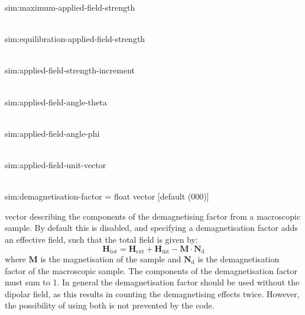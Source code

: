 {\zicf  sim:maximum-applied-field-strength}\\

{\zicf sim:equilibration-applied-field-strength}\\

{\zicf sim:applied-field-strength-increment}\\

{\zicf sim:applied-field-angle-theta}\\

{\zicf sim:applied-field-angle-phi}\\

{\zicf sim:applied-field-unit-vector}\\

{\zicf sim:demagnetisation-factor = float vector [default (000)]} vector describing the components of the demagnetising factor from a macroscopic sample. By default this is disabled, and specifying a demagnetisation factor adds an effective field, such that the total field is given by:
\begin{equation*}
\mathbf{H}_{\mathrm{tot}} = \mathbf{H}_{\mathrm{ext}} + \mathbf{H}_{\mathrm{int}} - \mathbf{M} \cdot \mathbf{N}_{\mathrm{d}}
\end{equation*}
where $\mathbf{M}$ is the magnetisation of the sample and $\mathbf{N}_{\mathrm{d}}
$ is the demagnetisation factor of the macroscopic sample. The components of the demagnetisation factor must sum to 1. In general the demagnetisation factor should be used without the dipolar field, as this results in counting the demagnetising effects twice. However, the possibility of using both is not prevented by the code.\\



